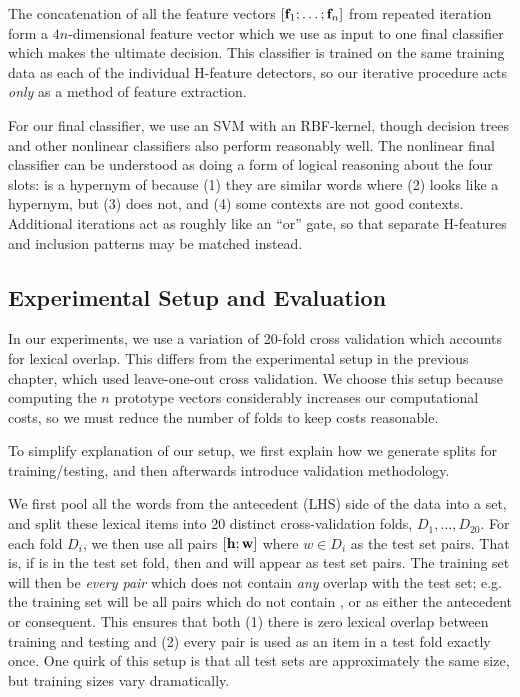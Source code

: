 The concatenation of all the feature vectors $[{\mathbf{f}}_1; \ldots; {\mathbf{f}}_n]$ from repeated iteration
form a $4n$-dimensional feature vector which we use as input to one final
classifier which makes the ultimate decision.  This classifier is trained on
the same training data as each of the individual H-feature detectors, so
our iterative procedure acts {\em only} as a method of feature
extraction.

For our final classifier, we use an SVM with an RBF-kernel, though decision
trees and other nonlinear classifiers also perform reasonably well. The
nonlinear final classifier can be understood as doing a form of logical
reasoning about the four slots:  is a hypernym of  because
(1) they are similar words where (2)  looks like a hypernym, but
(3)  does not, and (4) some  contexts are not good
 contexts. Additional iterations act as roughly like an ``or'' gate,
so that separate H-features and inclusion patterns may be matched instead.


\subsection{Experimental Setup and Evaluation}
\label{sec:singleexp}

In our experiments, we use a variation of 20-fold cross validation which
accounts for lexical overlap. This differs from the experimental setup in the
previous chapter, which used leave-one-out cross validation. We choose this
setup because computing the $n$ prototype vectors considerably increases our
computational costs, so we must reduce the number of folds to keep costs
reasonable.

To simplify explanation of our setup, we first explain how we
generate splits for training/testing, and then afterwards introduce validation
methodology.

We first pool all the words from the antecedent (LHS)
side of the data into a set, and split these lexical items into 20 distinct
cross-validation folds, $D_1,\ldots,D_{20}$. For each fold $D_i$, we then use all pairs $[{\mathbf{h}}; {\mathbf{w}}]$ where
$w\in D_i$ as the test set pairs. That is, if  is in the test set fold,
then  and  will appear
as test set pairs. The training set will then be {\em every pair} which does
not contain {\em any} overlap with the test set; e.g. the training
set will be all pairs which do not contain ,  or 
as either the antecedent or consequent. This ensures that both (1) there
is zero lexical overlap between training and testing and (2) every pair is
used as an item in a test fold exactly once. One quirk of this setup is
that all test sets are approximately the same size, but training sizes
vary dramatically.

